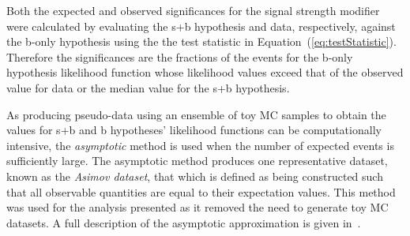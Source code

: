 Both the expected and observed significances for the signal strength modifier were calculated by evaluating the s+b hypothesis and data, respectively, against the b-only hypothesis using the the test statistic in Equation~(\ref{eq:testStatistic}).
Therefore the significances are the fractions of the events for the b-only hypothesis likelihood function whose likelihood values exceed that of the observed value for data or the median value for the s+b hypothesis.

As producing pseudo-data using an ensemble of toy MC samples to obtain the values for s+b and b hypotheses' likelihood functions can be computationally intensive, the \emph{asymptotic} method is used when the number of expected events is sufficiently large.
The asymptotic method produces one representative dataset, known as the \emph{Asimov dataset}, that which is defined as being constructed such that all observable quantities are equal to their expectation values.
This method was used for the analysis presented as it removed the need to generate toy MC datasets.
A full description of the asymptotic approximation is given in~\cite{AsymptoticFormulae}.

%
%
%
%
%

